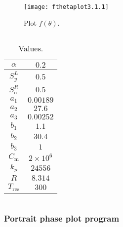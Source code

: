 \documentclass[
    8pt,
    aspectratio=1610,
    c,
    intlimits,
    leqno,
    professionalfonts,
]{beamer}
\begin{document}
\begin{frame}
	\begin{figure}[ht!]
		\centering
		\texttt{[image: fthetaplot3.1.1]}
		\caption{Plot $f\left(\theta\right)$.}
	\end{figure}
\end{frame}

\begin{frame}[fragile]
	\begin{columns}
		\begin{column}{0.51\textwidth}
			\begin{table}[ht!]
				\begin{tabular}{cc}
					\hline
					$\alpha$           & $0.2$            \\
					\hline
					$S^{L}_{y}$        & $0.5$            \\
					\hline
					$S^{R}_{\text{o}}$ & $0.5$            \\
					\hline
					$a_{1}$            & $0.00189$        \\
					\hline
					$a_{2}$            & $27.6$           \\
					\hline
					$a_{3}$            & $0.00252$        \\
					\hline
					$b_{1}$            & $1.1$            \\
					\hline
					$b_{2}$            & $30.4$           \\
					\hline
					$b_{3}$            & $1$              \\
					\hline
					$C_{\text{m}}$     & $2\times 10^{6}$ \\
					\hline
					$k_{p}$            & $24556$          \\
					\hline
					$R$                & $8.314$          \\
					\hline
					$T_{\text{res}}$   & $300$            \\
					\hline
				\end{tabular}
				\caption{Values.}
			\end{table}
		\end{column}
		\begin{column}{0.45\textwidth}
			\inputminted[fontsize=\tiny]{text}{calculations.txt}
		\end{column}
	\end{columns}
\end{frame}

\begin{frame}[fragile]
	\frametitle{Portrait phase plot program}
	\inputminted[fontsize=\tiny,firstline=1,lastline=25]{python}{phaseportrait.py}
\end{frame}
\end{document}
